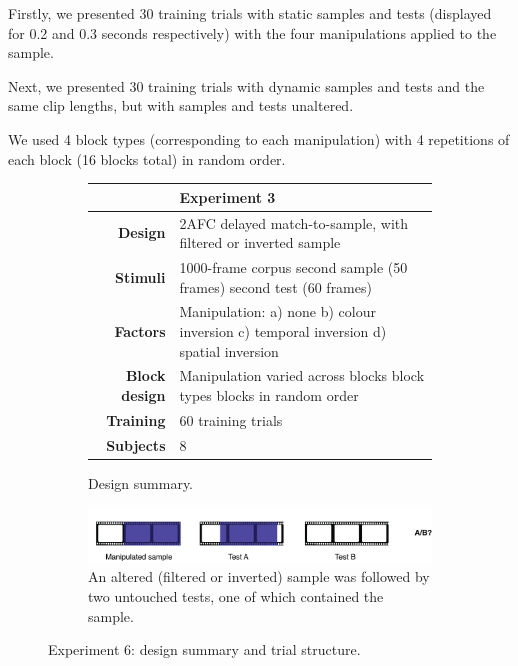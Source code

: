 Firstly, we presented 30 training trials with static samples and tests (displayed for 0.2 and 0.3 seconds respectively) with the four manipulations applied to the sample.

Next, we presented 30 training trials with dynamic samples and tests and the same clip lengths, but with samples and tests unaltered.

We used 4 block types (corresponding to each manipulation) with 4 repetitions of each block (16 blocks total) in random order.


\begin{figure}[H]
\centering
\renewcommand{\arraystretch}{1.8}

      \begin{subfigure}[b]{\textwidth}
\begin{tabular}{ >{\bfseries}r | p{8cm}   }
& \textbf{Experiment 3}\\
\hline
  
Design & 2AFC delayed match-to-sample, with filtered or inverted sample\\                   
Stimuli & 1000-frame corpus\newline
		1 second sample (50 frames)\newline
		1.2 second test (60 frames)\\
Factors & Manipulation:\newline
		a) none\newline
		b) colour inversion\newline
		c) temporal inversion\newline
		d) spatial inversion\\

Block design & Manipulation varied across blocks\newline
		4 block types \newline
		16 blocks in random order \\
Training &60 training trials \\
Subjects&8\\
\end{tabular}
\caption{Design summary.}
   \end{subfigure}

\begin{subfigure}[b]{\textwidth}
\centering
                \includegraphics[width=12cm]{img/fire5protocol.png}
                \caption{An altered (filtered or inverted) sample was followed by two untouched tests, one of which contained the sample.}     
        \end{subfigure}
\caption{Experiment 6: design summary and trial structure.}
\end{figure}


